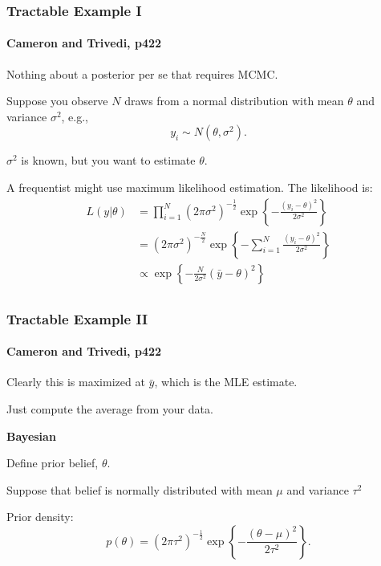 \documentclass[11pt, aspectratio=169]{beamer}
\newenvironment{wideitemize}{\itemize\addtolength{\itemsep}{10pt}}{\enditemize}
\begin{document}
\begin{frame}[t]\frametitle{Tractable Example I}
\framesubtitle{Cameron and Trivedi, p422}    

Nothing about a posterior per se that requires MCMC.


\begin{wideitemize}
	\item Suppose you observe $N$ draws from 
a normal distribution with mean $\theta$ and variance $\sigma^2$, e.g., 
$$y_i \sim N(\theta, \sigma^2).$$ 
	\item $\sigma^2$ is known, but you want to estimate $\theta$.
	\item A frequentist might use maximum likelihood estimation. The likelihood is:
\begin{align*}
L(y|\theta) &= \prod_{i=1}^N (2\pi \sigma^2)^{- \frac{1}{2} } \exp \left\{ - \frac{(y_i - \theta)^2}{2 \sigma^2} \right\} \\
&= (2\pi \sigma^2)^{- \frac{N}{2} } \exp  \left\{ - \sum_{i=1}^N \frac{(y_i - \theta)^2}{2 \sigma^2} \right\} \\
&  \propto  \exp  \left\{ - \frac{N}{2 \sigma^2}   (\bar{y} - \theta)^2 \right\} \\
\end{align*}
\end{wideitemize}


\end{frame}


\begin{frame}[t]\frametitle{Tractable Example II}
\framesubtitle{Cameron and Trivedi, p422}    

\begin{wideitemize}
	\item Clearly this is maximized at $\bar{y}$, which is the MLE estimate.
	\item Just compute the average from your data. 
\end{wideitemize}

\vspace{1em}
\textbf{Bayesian}
\begin{wideitemize}
	\item Define prior belief, $\theta$.
	\item Suppose that belief is normally distributed with mean $\mu$ and variance $\tau^2$
	\item Prior density:
	$$p(\theta) =  (2\pi \tau^2)^{- \frac{1}{2} } \exp \left\{ - \frac{(\theta - \mu)^2}{2 \tau^2} \right\}.$$

\end{wideitemize}

\end{frame}
\end{document}
